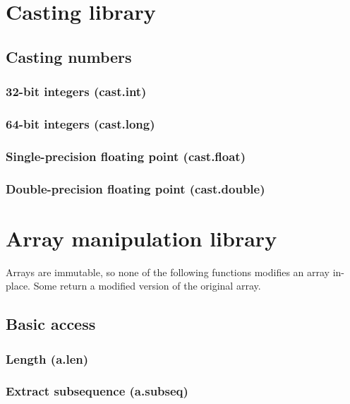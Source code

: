 \documentclass{article}
\theoremstyle{definition}
\begin{document}
\pagebreak

\section{Casting library}

\subsection{Casting numbers}

\subsubsection{32-bit integers (cast.int)}

\subsubsection{64-bit integers (cast.long)}

\subsubsection{Single-precision floating point (cast.float)}

\subsubsection{Double-precision floating point (cast.double)}

\pagebreak

\section{Array manipulation library}

Arrays are immutable, so none of the following functions modifies an array in-place.  Some return a modified version of the original array.

\subsection{Basic access}

\subsubsection{Length (a.len)}

\subsubsection{Extract subsequence (a.subseq)}
\end{document}
